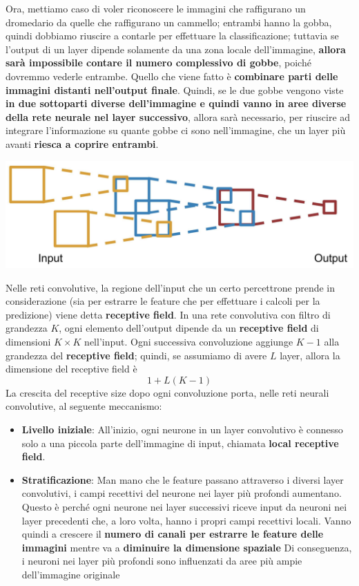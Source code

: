\documentclass[12pt]{article}
\begin{document}
Ora, mettiamo caso di voler riconoscere le immagini che raffigurano un dromedario da quelle che raffigurano un cammello; entrambi hanno la gobba, quindi dobbiamo riuscire a contarle per effettuare la classificazione; tuttavia se l'output di un layer dipende solamente da una zona locale dell'immagine,
\textbf{allora sarà impossibile contare il numero complessivo di gobbe}, poiché dovremmo vederle entrambe. Quello che viene fatto è \textbf{combinare parti delle immagini distanti nell'output finale}. Quindi, se le due gobbe vengono viste \textbf{in due sottoparti diverse dell'immagine e quindi vanno in aree diverse della rete neurale nel layer successivo}, allora sarà necessario, per riuscire ad integrare l'informazione su quante gobbe ci sono nell'immagine, 
che un layer più avanti \textbf{riesca a coprire entrambi}.
\begin{center}
    \includegraphics[width =0.75\linewidth]{Images/161.PNG}
\end{center}
Nelle reti convolutive, la regione dell'input che un certo percettrone prende in considerazione (sia per estrarre le feature che per effettuare i calcoli per la predizione) viene detta \textbf{receptive field}.
In una rete convolutiva con filtro di grandezza $K$, ogni elemento dell'output dipende da un \textbf{receptive field} di dimensioni $K \times K$ nell'input.
Ogni successiva convoluzione aggiunge $K - 1$ alla grandezza del \textbf{receptive field}; quindi, se assumiamo di avere $L$ layer, allora la dimensione del receptive field è
$$1 + L(K - 1)$$
La crescita del receptive size dopo ogni convoluzione porta, nelle reti neurali convolutive, al seguente meccanismo:
\begin{itemize}
    \item \textbf{Livello iniziale}: All'inizio, ogni neurone in un layer convolutivo è connesso solo a una piccola parte dell'immagine di input, chiamata \textbf{local receptive field}.
    \item \textbf{Stratificazione}: Man mano che le feature passano attraverso i diversi layer convolutivi, i campi recettivi del neurone nei layer più profondi aumentano. Questo è perché ogni neurone nei layer successivi riceve input da neuroni nei layer precedenti che, a loro volta, hanno i propri campi recettivi locali. Vanno quindi a crescere il \textbf{numero di canali per estrarre le feature delle immagini} mentre va a \textbf{diminuire la dimensione spaziale}
    Di conseguenza, i neuroni nei layer più profondi sono influenzati da aree più ampie dell'immagine originale 
\end{itemize}
\end{document}
